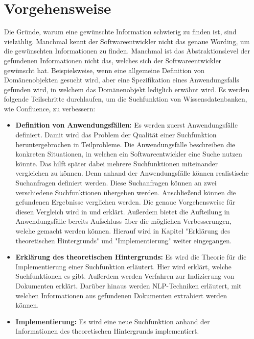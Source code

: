 \section{Vorgehensweise}
Die Gründe, warum eine gewünschte Information schwierig zu finden ist, sind vielzählig.
Manchmal kennt der Softwareentwickler nicht das genaue Wording, um die gewünschten Informationen zu finden.
Manchmal ist das Abstraktionslevel der gefundenen Informationen nicht das, welches sich der Softwareentwickler gewünscht hat.
Beispielsweise, wenn eine allgemeine Definition von Domänenobjekten gesucht wird, aber eine Spezifikation eines Anwendungsfalls gefunden wird, in welchem das Domänenobjekt lediglich erwähnt wird.
Es werden folgende Teilschritte durchlaufen, um die Suchfunktion von Wissensdatenbanken, wie Confluence, zu verbessern:
\begin{itemize}
   \item \textbf{Definition von Anwendungsfällen:}
         Es werden zuerst Anwendungsfälle definiert.
         Damit wird das Problem der Qualität einer Suchfunktion heruntergebrochen in Teilprobleme.
         Die Anwendungsfälle beschreiben die konkreten Situationen, in welchen ein Softwareentwickler eine Suche nutzen könnte.
         Das hilft später dabei mehrere Suchfunktionen miteinander vergleichen zu können.
         Denn anhand der Anwendungsfälle können realistische Suchanfragen definiert werden.
         Diese Suchanfragen können an zwei verschiedene Suchfunktionen übergeben werden.
         Anschließend können die gefundenen Ergebnisse verglichen werden.
         Die genaue Vorgehensweise für diesen Vergleich wird in  und  erklärt.
         Außerdem bietet die Aufteilung in Anwendungsfälle bereits Aufschluss über die möglichen Verbesserungen, welche gemacht werden können.
         Hierauf wird in Kapitel "Erklärung des theoretischen Hintergrunds" und "Implementierung" weiter eingegangen.
   \item \textbf{Erklärung des theoretischen Hintergrunds:}
         Es wird die Theorie für die Implementierung einer Suchfunktion erläutert.
         Hier wird erklärt, welche Suchfunktionen es gibt.
         Außerdem werden Verfahren zur Indizierung von Dokumenten erklärt.
         Darüber hinaus werden NLP-Techniken erläutert, mit welchen Informationen aus gefundenen Dokumenten extrahiert werden können.
   \item \textbf{Implementierung:}
         Es wird eine neue Suchfunktion anhand der Informationen des theoretischen Hintergrunds implementiert.

\end{itemize}
